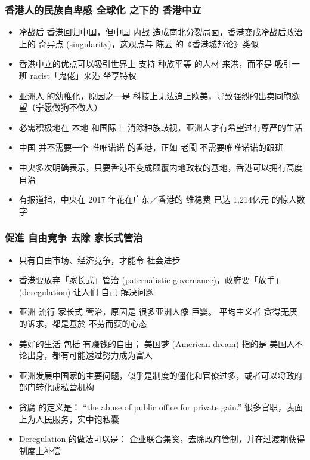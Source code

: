 \documentclass[16pt]{beamer}
\newcommand{\emp}[1]{{\color{blue}#1}}
\begin{document}
\begin{frame}
\frametitle{香港人的民族自卑感 \textbullet 全球化 之下的 香港中立}
\begin{itemize}
	\item 冷战后 香港回归中国，但中国 内战 造成南北分裂局面，香港变成冷战后政治上的 奇异点 (\emp{singularity})，这观点与 陈云 的《香港城邦论》类似

	\item 香港中立的优点可以吸引世界上 支持 种族平等 的人材 来港，而不是 吸引一班 racist「鬼佬」来港 坐享特权

	\item 亚洲人 的幼稚化，原因之一是 科技上无法追上欧美，导致强烈的出卖同胞欲望（宁愿做狗不做人）
	
	\item 必需积极地在 本地 和国际上 消除种族歧视，亚洲人才有希望过有尊严的生活
	
	\item 中国 并不需要一个 唯唯诺诺 的香港，正如 老闆 不需要唯唯诺诺的跟班
	
	\item 中央多次明确表示，只要香港不变成颠覆内地政权的基地，香港可以拥有高度自治
	
	\item 有报道指，中央在 2017 年花在广东／香港的 维稳费 已达 1,214亿元 的惊人数字

\end{itemize}
\end{frame}

\begin{frame}
\frametitle{促進 自由竞争 \textbullet 去除 家长式管治}
\begin{itemize}
	\item 只有自由市场、经济竞争，才能令 社会进步
	
	\item 香港要放弃「家长式」管治 (paternalistic governance)，政府要「放手」(\emp{deregulation}) 让人们 自己 解决问题
	
	\item 亚洲 流行 家长式 管治，原因是 很多亚洲人像 巨婴。 平均主义者 贪得无厌的诉求，都是基於 不劳而获的心态
	
	\item 美好的生活 包括 有赚钱的自由； 美国梦 (American dream) 指的是 美国人不论出身，都有可能透过努力成为富人
	
	\item 亚洲发展中国家的主要问题，似乎是制度的僵化和官僚过多，或者可以将政府部门转化成私营机构
	
	\item 贪腐 的定义是： ``the abuse of public office for private gain.''  很多官职，表面上为人民服务，实中饱私囊

	\item Deregulation 的做法可以是： 企业联合集资，去除政府管制，并在过渡期获得制度上补偿
\end{itemize}
\end{frame}
\end{document}
